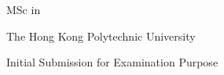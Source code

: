 \begin{titlepage}
\centering
\vspace*{12mm}
{\Large\bfseries\MakeUppercase{\disstitle}\par}
\vfill
{\large\studentname\par}
\vspace{12mm}
{\large MSc in \degreefield\par}
\vspace{12mm}
{\large The Hong Kong Polytechnic University\par}
\vspace{12mm}
{\large\awardyear\par}
\vfill
{\large Initial Submission for Examination Purpose\par}
\end{titlepage}
